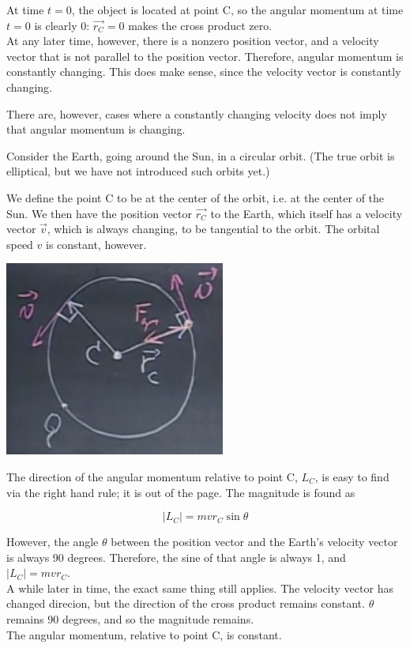 \documentclass[12pt,a4paper]{report}
\begin{document}
At time $t = 0$, the object is located at point C, so the angular momentum at time $t = 0$ is clearly 0: $\vec{r_C} = 0$ makes the cross product zero.\\
At any later time, however, there is a nonzero position vector, and a velocity vector that is not parallel to the position vector. Therefore, angular momentum is constantly changing. This does make sense, since the velocity vector is constantly changing.

There are, however, cases where a constantly changing velocity does not imply that angular momentum is changing.

Consider the Earth, going around the Sun, in a circular orbit. (The true orbit is elliptical, but we have not introduced such orbits yet.)

We define the point C to be at the center of the orbit, i.e. at the center of the Sun. We then have the position vector $\vec{r_C}$ to the Earth, which itself has a velocity vector $\vec{v}$, which is always changing, to be tangential to the orbit. The orbital speed $v$ is constant, however.

\begin{center}
\includegraphics[scale=0.7]{Graphics/lec20_orbit_torque}
\end{center}

The direction of the angular momentum relative to point C, $L_C$, is easy to find via the right hand rule; it is out of the page. The magnitude is found as

\begin{equation}
|L_C| = m v r_C \sin \theta
\end{equation}

However, the angle $\theta$ between the position vector and the Earth's velocity vector is always 90 degrees. Therefore, the sine of that angle is always 1, and $|L_C| = m v r_C$.\\
A while later in time, the exact same thing still applies. The velocity vector has changed direcion, but the direction of the cross product remains constant. $\theta$ remains 90 degrees, and so the magnitude remains.\\
The angular momentum, relative to point C, is constant.
\end{document}
